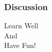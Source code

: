 \documentclass[12pt, t]{beamer}
\begin{document}
\begin{frame}
    \frametitle{Discussion}
    \vspace{1.5cm}
    \Large
    \centering
    Learn Well\\
    And\\
    Have Fun!\\
    

\end{frame}
\end{document}
